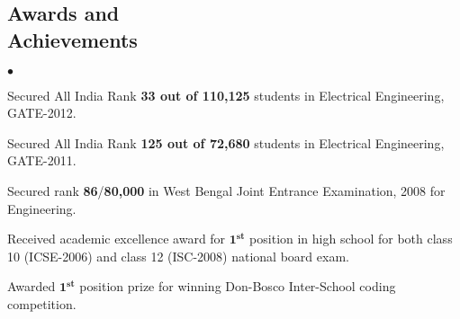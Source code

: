 \documentclass[margin,line]{res}
\newenvironment{list2}{
  \begin{list}{$\bullet$}{%
      \setlength{\itemsep}{0in}
      \setlength{\parsep}{0in} \setlength{\parskip}{0in}
      \setlength{\topsep}{0in} \setlength{\partopsep}{0in} 
      \setlength{\leftmargin}{0.2in}}}{\end{list}}
\begin{document}
\begin{resume}
\section{\sc Awards and\\ Achievements} 
\begin{list2}
	\item Secured All India Rank \textbf{33 out of 110,125} students in Electrical Engineering, GATE-2012.
	\item Secured All India Rank \textbf{125 out of 72,680} students in Electrical Engineering, GATE-2011.
	\item Secured rank \textbf{86}/\textbf{80,000} in West Bengal Joint Entrance Examination, 2008 for Engineering.
	\item Received academic excellence award for $\mathbf{1^{st}}$ position in high school for both class 10 (ICSE-2006) and class 12 (ISC-2008) national board exam.
	\item Awarded $\mathbf{1^{st}}$ position prize for winning Don-Bosco Inter-School coding competition.
\end{list2}

%
%


\end{resume}
\end{document}
